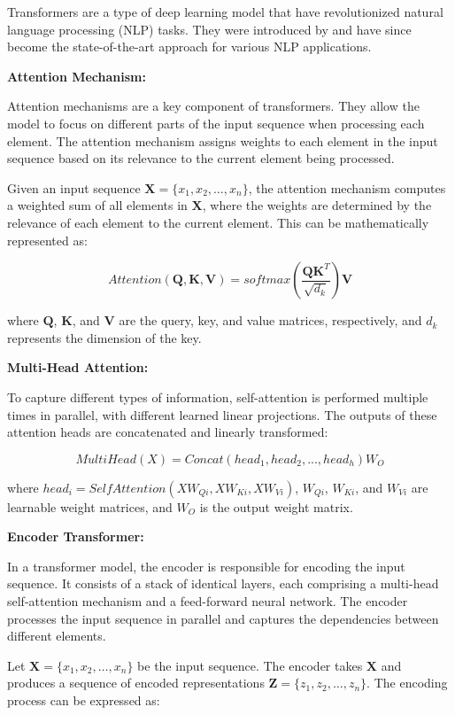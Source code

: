 \documentclass[a4paper,12pt]{article}
\begin{document}
Transformers are a type of deep learning model that have revolutionized natural language processing (NLP) tasks. They were introduced by \cite{attention} and have since become the state-of-the-art approach for various NLP applications.

\textbf{Attention Mechanism:}

Attention mechanisms are a key component of transformers. They allow the model to focus on different parts of the input sequence when processing each element. The attention mechanism assigns weights to each element in the input sequence based on its relevance to the current element being processed.

Given an input sequence $\mathbf{X} = \{x_1, x_2, \ldots, x_n\}$, the attention mechanism computes a weighted sum of all elements in $\mathbf{X}$, where the weights are determined by the relevance of each element to the current element. This can be mathematically represented as:

$$Attention(\mathbf{Q}, \mathbf{K}, \mathbf{V}) = softmax\left(\frac{\mathbf{QK}^T}{\sqrt{d_k}}\right) \mathbf{V}$$

where $\mathbf{Q}$, $\mathbf{K}$, and $\mathbf{V}$ are the query, key, and value matrices, respectively, and $d_k$ represents the dimension of the key.

\textbf{Multi-Head Attention:}

To capture different types of information, self-attention is performed multiple times in parallel, with different learned linear projections. The outputs of these attention heads are concatenated and linearly transformed:

$$MultiHead(X) = Concat(head_1, head_2, ..., head_h)W_O$$

where $head_i = SelfAttention(XW_{Qi}, XW_{Ki}, XW_{Vi})$, $W_{Qi}$, $W_{Ki}$, and $W_{Vi}$ are learnable weight matrices, and $W_O$ is the output weight matrix.

\textbf{Encoder Transformer:}

In a transformer model, the encoder is responsible for encoding the input sequence. It consists of a stack of identical layers, each comprising a multi-head self-attention mechanism and a feed-forward neural network. The encoder processes the input sequence in parallel and captures the dependencies between different elements.

Let $\mathbf{X} = \{x_1, x_2, \ldots, x_n\}$ be the input sequence. The encoder takes $\mathbf{X}$ and produces a sequence of encoded representations $\mathbf{Z} = \{z_1, z_2, \ldots, z_n\}$. The encoding process can be expressed as:
\end{document}
